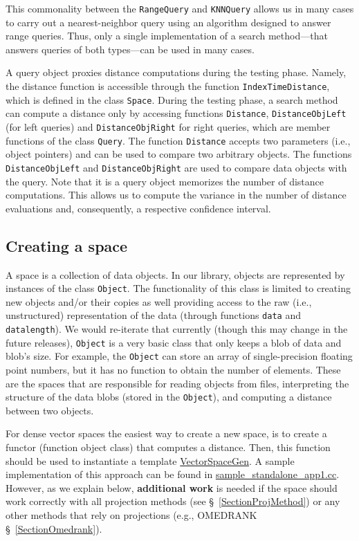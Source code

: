 \documentclass[runningheads,a4paper]{llncs}
\newcommand{\replocfile}{https://github.com/searchivarius/NonMetricSpaceLib/blob/pserv/}
\newcommand{\ttt}[1]{\texttt{#1}}
\begin{document}
This commonality between the \ttt{RangeQuery} and \ttt{KNNQuery}
allows us in many cases to carry out a nearest-neighbor query 
using an algorithm designed to answer range queries.
Thus, only a single implementation of a search method---that answers queries of both types---can be used in many cases.

A query object proxies distance computations during the testing phase.
Namely, the distance function is accessible through the function
\ttt{IndexTimeDistance}, which is defined in the class \ttt{Space}.
During the testing phase, a search method can compute a distance
only by accessing functions \ttt{Distance}, 
\ttt{DistanceObjLeft} (for left queries) and 
\ttt{DistanceObjRight} for right queries,
which are member functions of the class \ttt{Query}.
The function \ttt{Distance} accepts two parameters (i.e., object pointers) and 
can be used to compare two arbitrary objects.
The functions \ttt{DistanceObjLeft} and \ttt{DistanceObjRight} are used 
to compare data objects with the query.
Note that it is a query object  memorizes the number of distance computations.
This allows us to compute the variance in the number of distance evaluations
and, consequently, a respective confidence interval.



\subsection{Creating a space}\label{SectionCreateSpace}
A space is a collection of data objects.
In our library, objects are represented by instances
of the class \ttt{Object}.
The functionality of this class is limited to
creating new objects and/or their copies as well providing
access to the raw (i.e., unstructured) representation of the data
(through functions \ttt{data} and \ttt{datalength}).
We would re-iterate that currently (though this may change in the future releases),
\ttt{Object} is a very basic class that only keeps a blob of data and blob's size.
For example, the \ttt{Object} can store an array of single-precision floating point
numbers, but it has no function to obtain the number of elements.
These are the spaces that are responsible for reading objects from files,
interpreting the structure of the data blobs (stored in the \ttt{Object}), 
and computing a distance between two objects.


For dense vector spaces the easiest way to create a new space,
is to create a functor (function object class) that computes a distance.
Then, this function should be used to instantiate a template
\href{\replocfile similarity_search/include/space/space_vector_gen.h}{VectorSpaceGen}.
A sample implementation of this approach can be found
in \href{\replocfile sample_standalone_app/sample_standalone_app1.cc#L114}{sample\_standalone\_app1.cc}.
However, as we explain below, \textbf{additional work} is needed if the space should work correctly with all projection methods 
(see \S~\ref{SectionProjMethod}) or any other methods that rely on projections (e.g., OMEDRANK \S~\ref{SectionOmedrank}).
\end{document}
